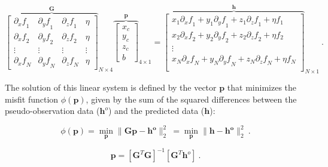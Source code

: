     \begin{equation}
    {\overbrace{
    \begin{bmatrix}
      {\partial_x f}_1 & {\partial_y f}_1 & {\partial_z f}_1 & \eta \\
      {\partial_x f}_2 & {\partial_y f}_2 & {\partial_z f}_2 & \eta \\
      \vdots & \vdots & \vdots & \vdots \\
      {\partial_x f}_N & {\partial_y f}_N & {\partial_z f}_N & \eta
    \end{bmatrix}
    }^{\mathbf{G}}}_{N \times 4}
    {\overbrace{
    \begin{bmatrix}
      x_c \\ y_c \\ z_c \\ b
    \end{bmatrix}
    }^{\mathbf{p}}}_{4 \times 1}
    =
    {\overbrace{
    \begin{bmatrix}
      x_1 {\partial_x f}_1 + y_1 {\partial_y f}_1 + z_1 {\partial_z f}_1 + \eta f_1 \\
      x_2 {\partial_x f}_2 + y_2 {\partial_y f}_2 + z_2 {\partial_z f}_2 + \eta f_2 \\
      \vdots \\
      x_N {\partial_x f}_N + y_N {\partial_y f}_N + z_N {\partial_z f}_N + \eta f_N \\
    \end{bmatrix}
    }^{\mathbf{h}}}_{N \times 1}
    \ .
    \end{equation}
    
    The solution of this linear system is defined by the vector $\mathbf{p}$ that minimizes the misfit function $\phi(\mathbf{p})$, given by the sum of the squared differences between the pseudo-observation data ($\mathbf{h}^o$) and the predicted data ($\mathbf{h}$):
    
    \begin{equation}
    \label{function_phi}
    \phi(\mathbf{p}) = \min_{\mathbf{p}} \| \mathbf{G}\mathbf{p} - \mathbf{\mathbf{h}^o} \|_2^2\ = \min_{\mathbf{p}} \| \mathbf{h} - \mathbf{\mathbf{h}^o} \|_2^2\
    .
    \end{equation}
    
    
    \begin{equation}
    \label{euler_solution}
    \mathbf{p} = {[\mathbf{G}^T \mathbf{G}]}^{-1} [\mathbf{G}^T \mathbf{h}^o]\ .
    \end{equation}
    

